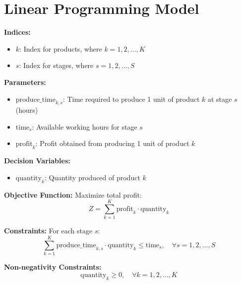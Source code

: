 \documentclass{article}
\begin{document}
\section*{Linear Programming Model}

\textbf{Indices:}
\begin{itemize}
    \item \( k \): Index for products, where \( k = 1, 2, \ldots, K \)
    \item \( s \): Index for stages, where \( s = 1, 2, \ldots, S \)
\end{itemize}

\textbf{Parameters:}
\begin{itemize}
    \item \( \text{produce\_time}_{k, s} \): Time required to produce 1 unit of product \( k \) at stage \( s \) (hours)
    \item \( \text{time}_{s} \): Available working hours for stage \( s \)
    \item \( \text{profit}_{k} \): Profit obtained from producing 1 unit of product \( k \)
\end{itemize}

\textbf{Decision Variables:}
\begin{itemize}
    \item \( \text{quantity}_{k} \): Quantity produced of product \( k \)
\end{itemize}

\textbf{Objective Function:}
Maximize total profit:
\[
Z = \sum_{k=1}^{K} \text{profit}_{k} \cdot \text{quantity}_{k}
\]

\textbf{Constraints:}
For each stage \( s \):
\[
\sum_{k=1}^{K} \text{produce\_time}_{k, s} \cdot \text{quantity}_{k} \leq \text{time}_{s}, \quad \forall s = 1, 2, \ldots, S
\]

\textbf{Non-negativity Constraints:}
\[
\text{quantity}_{k} \geq 0, \quad \forall k = 1, 2, \ldots, K
\]
\end{document}
